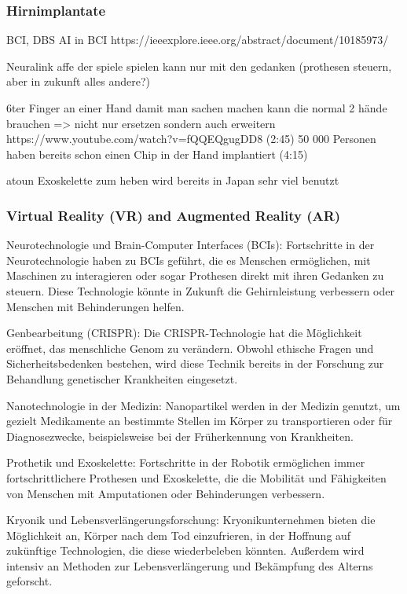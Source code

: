 \documentclass[a4paper,
DIV=13,
12pt,
BCOR=10mm,
department=FakEI,
twoside,
parskip=half,
automark,
]{OTHRartcl}
\begin{document}
\subsubsection*{Hirnimplantate}
BCI, DBS
AI in BCI
https://ieeexplore.ieee.org/abstract/document/10185973/

Neuralink affe der spiele spielen kann nur mit den gedanken (prothesen steuern, aber in zukunft alles andere?)

6ter Finger an einer Hand damit man sachen machen kann die normal 2 hände brauchen => nicht nur ersetzen sondern auch erweitern
https://www.youtube.com/watch?v=fQQEQgugDD8 (2:45)
50 000 Personen haben bereits schon einen Chip in der Hand implantiert (4:15)

atoun Exoskelette zum heben wird bereits in Japan sehr viel benutzt
\subsubsection*{Virtual Reality (VR) and Augmented Reality (AR)}


Neurotechnologie und Brain-Computer Interfaces (BCIs): Fortschritte in der Neurotechnologie haben zu BCIs geführt, die es Menschen ermöglichen, mit Maschinen zu interagieren oder sogar Prothesen direkt mit ihren Gedanken zu steuern. Diese Technologie könnte in Zukunft die Gehirnleistung verbessern oder Menschen mit Behinderungen helfen.

Genbearbeitung (CRISPR): Die CRISPR-Technologie hat die Möglichkeit eröffnet, das menschliche Genom zu verändern. Obwohl ethische Fragen und Sicherheitsbedenken bestehen, wird diese Technik bereits in der Forschung zur Behandlung genetischer Krankheiten eingesetzt.

Nanotechnologie in der Medizin: Nanopartikel werden in der Medizin genutzt, um gezielt Medikamente an bestimmte Stellen im Körper zu transportieren oder für Diagnosezwecke, beispielsweise bei der Früherkennung von Krankheiten.

Prothetik und Exoskelette: Fortschritte in der Robotik ermöglichen immer fortschrittlichere Prothesen und Exoskelette, die die Mobilität und Fähigkeiten von Menschen mit Amputationen oder Behinderungen verbessern.

Kryonik und Lebensverlängerungsforschung: Kryonikunternehmen bieten die Möglichkeit an, Körper nach dem Tod einzufrieren, in der Hoffnung auf zukünftige Technologien, die diese wiederbeleben könnten. Außerdem wird intensiv an Methoden zur Lebensverlängerung und Bekämpfung des Alterns geforscht.
\end{document}
